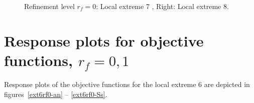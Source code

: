 \documentclass[review,times,3p,10pt]{elsarticle}
\begin{document}
\begin{figure}[htb!]
\label{rf0ex4}
\caption{Refinement level $r_f=0$: Local extreme 7 , Right: Local extreme 8.}
\end{figure}


\section{Response plots for objective functions, $r_f=0,1$}
 
 Response plots of the objective functions for the local extreme 6 are depicted in figures~\ref{ext6rf0-an} -- \ref{ext6rf0-Ss}.
 
\end{document}
